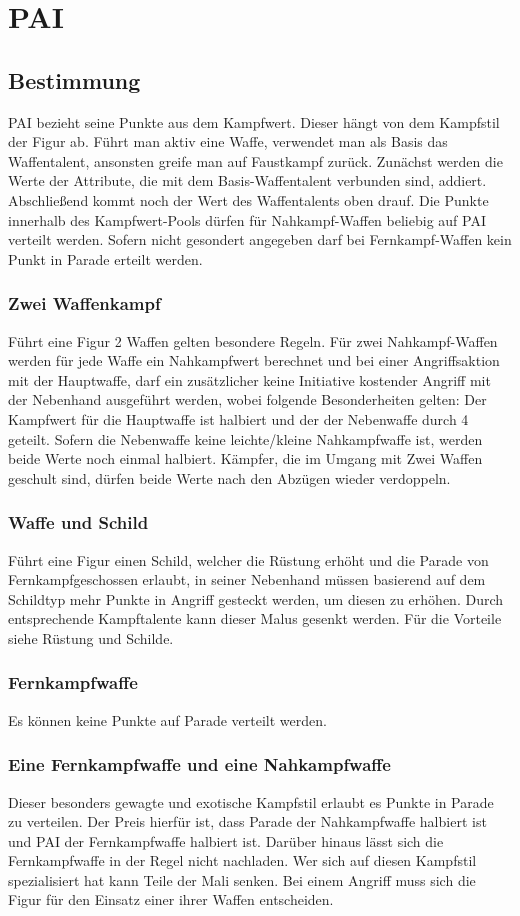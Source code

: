 \documentclass[a4paper,12pt,oneside]{book}
\begin{document}
\chapter{PAI}

\section{Bestimmung}
PAI bezieht seine Punkte aus dem Kampfwert. Dieser hängt von dem Kampfstil der Figur ab. Führt man aktiv eine Waffe, verwendet man als Basis das Waffentalent, ansonsten greife man auf Faustkampf zurück. 
Zunächst werden die Werte der Attribute, die mit dem Basis-Waffentalent verbunden sind, addiert. Abschließend kommt noch der Wert des Waffentalents oben drauf. Die Punkte innerhalb des Kampfwert-Pools dürfen
für Nahkampf-Waffen beliebig auf PAI verteilt werden. Sofern nicht gesondert angegeben darf bei Fernkampf-Waffen kein Punkt in Parade erteilt werden.
\subsection{Zwei Waffenkampf}
Führt eine Figur 2 Waffen gelten besondere Regeln.
Für zwei Nahkampf-Waffen werden für jede Waffe ein Nahkampfwert berechnet und bei einer Angriffsaktion mit der Hauptwaffe, darf ein zusätzlicher keine Initiative kostender Angriff mit der Nebenhand ausgeführt werden, wobei folgende Besonderheiten gelten:
Der Kampfwert für die Hauptwaffe ist halbiert und der der Nebenwaffe durch 4 geteilt. Sofern die Nebenwaffe keine leichte/kleine Nahkampfwaffe ist, werden beide Werte noch einmal halbiert.
Kämpfer, die im Umgang mit Zwei Waffen geschult sind, dürfen beide Werte nach den Abzügen wieder verdoppeln.
\subsection{Waffe und Schild}
Führt eine Figur einen Schild, welcher die Rüstung erhöht und die Parade von Fernkampfgeschossen erlaubt, in seiner Nebenhand müssen basierend auf dem Schildtyp mehr Punkte in Angriff gesteckt werden, um diesen zu erhöhen. Durch entsprechende Kampftalente kann dieser Malus gesenkt werden. Für die Vorteile siehe Rüstung und Schilde.

\subsection{Fernkampfwaffe}
Es können keine Punkte auf Parade verteilt werden. 

\subsection{Eine Fernkampfwaffe und eine Nahkampfwaffe}
Dieser besonders gewagte und exotische Kampfstil erlaubt es Punkte in Parade zu verteilen. Der Preis hierfür ist, dass Parade der Nahkampfwaffe halbiert ist und PAI der Fernkampfwaffe halbiert ist. Darüber hinaus lässt
sich die Fernkampfwaffe in der Regel nicht nachladen. Wer sich auf diesen Kampfstil spezialisiert hat kann Teile der Mali senken. Bei einem Angriff muss sich die Figur für den Einsatz einer ihrer Waffen entscheiden.
\end{document}
